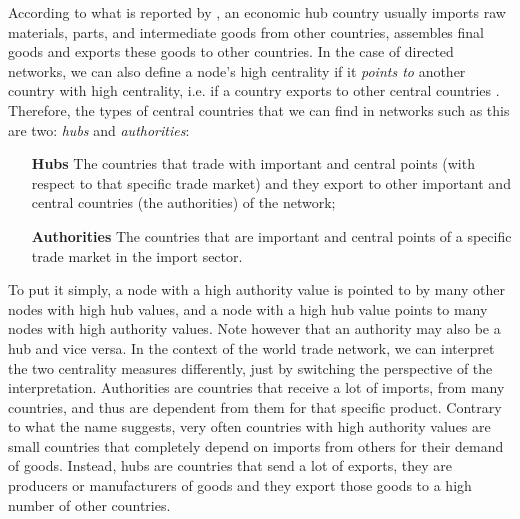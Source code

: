 According to what is reported by \textcite{deguchi2014}, an economic hub country usually imports raw materials, parts, and intermediate goods from other countries, assembles final goods and exports these goods to other countries. %
In the case of directed networks, we can also define a node's high centrality if it \textit{points to} another country with high centrality, i.e. if a country exports to other central countries \cite{sajedianfard2021quantitative}. Therefore, the types of central countries that we can find in networks such as this are two: \textit{hubs} and \textit{authorities}:
\begin{itemize}
    \item[\textbf{Hubs}] The countries that trade with important and central points (with respect to that specific trade market) and they export to other important and central countries (the authorities) of the network;
    \item[\textbf{Authorities}] The countries that are important and central points of a specific trade market in the import sector.
\end{itemize}
To put it simply, a node with a high authority value is pointed to by many other nodes with high hub values, and a node with a high hub value points to many nodes with high authority values. Note however that an authority may also be a hub and vice versa. In the context of the world trade network, we can interpret the two centrality measures differently, just by switching the perspective of the interpretation. Authorities are countries that receive a lot of imports, from many countries, and thus are dependent from them for that specific product. Contrary to what the name suggests, very often countries with high authority values are small countries that completely depend on imports from others for their demand of goods. Instead, hubs are countries that send a lot of exports, they are producers or manufacturers of goods and they export those goods to a high number of other countries.


